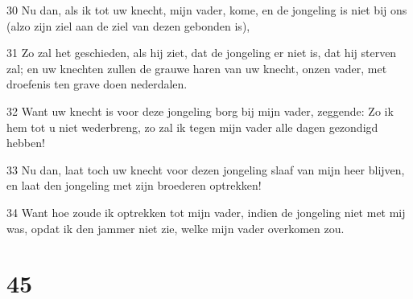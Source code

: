 \par 30 Nu dan, als ik tot uw knecht, mijn vader, kome, en de jongeling is niet bij ons (alzo zijn ziel aan de ziel van dezen gebonden is),
\par 31 Zo zal het geschieden, als hij ziet, dat de jongeling er niet is, dat hij sterven zal; en uw knechten zullen de grauwe haren van uw knecht, onzen vader, met droefenis ten grave doen nederdalen.
\par 32 Want uw knecht is voor deze jongeling borg bij mijn vader, zeggende: Zo ik hem tot u niet wederbreng, zo zal ik tegen mijn vader alle dagen gezondigd hebben!
\par 33 Nu dan, laat toch uw knecht voor dezen jongeling slaaf van mijn heer blijven, en laat den jongeling met zijn broederen optrekken!
\par 34 Want hoe zoude ik optrekken tot mijn vader, indien de jongeling niet met mij was, opdat ik den jammer niet zie, welke mijn vader overkomen zou.

\chapter{45}

